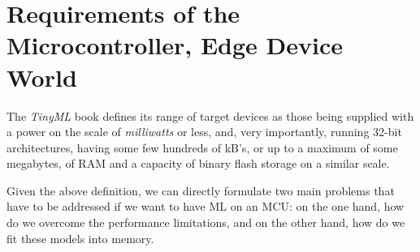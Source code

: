 \section{Requirements of the Microcontroller, Edge Device World}
The \textit{TinyML} book defines its range of target devices as those being supplied with a power on the scale of \textit{milliwatts} or less, and, very importantly, running 32-bit architectures, having some few hundreds of kB's, or up to a maximum of some megabytes, of RAM and a capacity of binary flash storage on a similar scale. \cite{tinyml_def} \par
Given the above definition, we can directly formulate two main problems that have to be addressed if we want to have ML on an MCU: on the one hand, how do we overcome the performance limitations, and on the other hand, how do we fit these models into memory. \par

